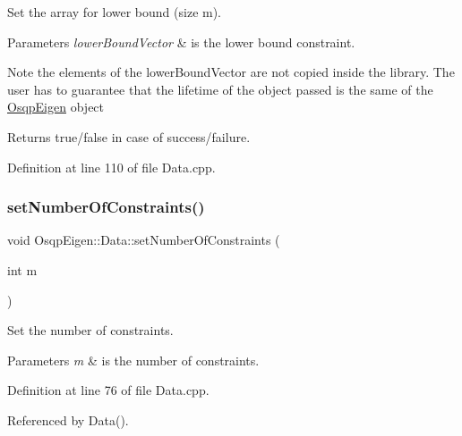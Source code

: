 Set the array for lower bound (size m). 


\begin{DoxyParams}{Parameters}
{\em lower\+Bound\+Vector} & is the lower bound constraint. \\
\hline
\end{DoxyParams}
\begin{DoxyNote}{Note}
the elements of the lower\+Bound\+Vector are not copied inside the library. The user has to guarantee that the lifetime of the object passed is the same of the \mbox{\hyperlink{namespaceOsqpEigen}{Osqp\+Eigen}} object 
\end{DoxyNote}
\begin{DoxyReturn}{Returns}
true/false in case of success/failure. 
\end{DoxyReturn}


Definition at line 110 of file Data.\+cpp.

\mbox{\label{classOsqpEigen_1_1Data_aea746479660e90e46fbf185dca91d936}} 
\subsubsection{\texorpdfstring{set\+Number\+Of\+Constraints()}{setNumberOfConstraints()}}
{\footnotesize\ttfamily void Osqp\+Eigen\+::\+Data\+::set\+Number\+Of\+Constraints (\begin{DoxyParamCaption}\item[{int}]{m }\end{DoxyParamCaption})}



Set the number of constraints. 


\begin{DoxyParams}{Parameters}
{\em m} & is the number of constraints. \\
\hline
\end{DoxyParams}


Definition at line 76 of file Data.\+cpp.



Referenced by Data().

\mbox{\label{classOsqpEigen_1_1Data_abd09d8d70fcbaa8db833b87ca0bcbbab}} 

